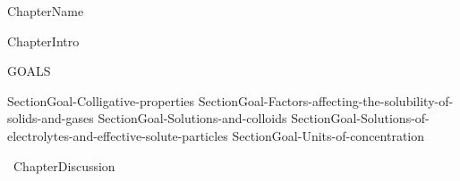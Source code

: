 \documentclass[main.tex]{subfiles}
\newcommand\chapterlabel{Ch-solutions}\setcounter{figurenewcounter}{0}\setcounter{tablenewcounter}{0}\setcounter{formulanewcounter}{0}
\begin{document}
  
{ChapterName}


      \begin{marginfigure}
\end{marginfigure}
{ChapterIntro}


\begin{marginfigure}%
\begin{mytcbox}{GOALS}
\begin{enumerate}[label=\protect\circled{\color{white}\arabic*}]
{SectionGoal-Colligative-properties}
{SectionGoal-Factors-affecting-the-solubility-of-solids-and-gases}
{SectionGoal-Solutions-and-colloids}
{SectionGoal-Solutions-of-electrolytes-and-effective-solute-particles}
{SectionGoal-Units-of-concentration}
\end{enumerate}
\end{mytcbox}
\vspace{1cm}
\begin{tcolorbox}[enhanced,colback=red!5!white,colframe=black!50!red,boxrule=1pt,
  arc=0pt,outer arc=0pt,drop heavy lifted shadow]
\faGears\ 
{ChapterDiscussion}





\end{tcolorbox}
\end{marginfigure}%
\end{document}
